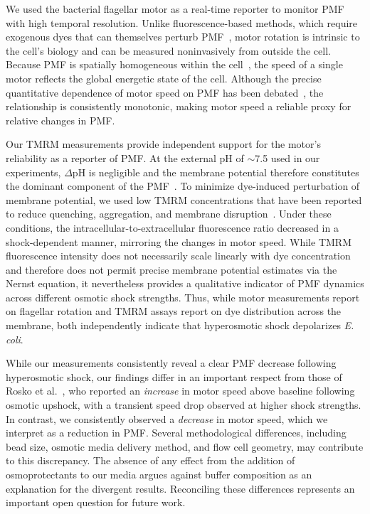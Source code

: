\documentclass[twocolumn]{biophys-new}%
\begin{document}
We used the bacterial flagellar motor as a real-time reporter to monitor PMF with high temporal resolution. Unlike fluorescence-based methods, which require exogenous dyes that can themselves perturb PMF~\cite{MANCINI20204l}, motor rotation is intrinsic to the cell's biology and can be measured noninvasively from outside the cell. Because PMF is spatially homogeneous within the cell~\cite{biquet2024spatiotemporal}, the speed of a single motor reflects the global energetic state of the cell. Although the precise quantitative dependence of motor speed on PMF has been debated~\cite{fung_berg1995,GABEL2003l,Krasnopeeva2024}, the relationship is consistently monotonic,  making motor speed a reliable proxy for relative changes in PMF.

Our TMRM measurements provide independent support for the motor’s reliability as a reporter of PMF. At the external pH of $\sim$7.5 used in our experiments, $\Delta \text{pH}$ is negligible and the membrane potential therefore constitutes the dominant component of the PMF~\cite{padan1976,slonczewski1981}. To minimize dye-induced perturbation of membrane potential, we used low TMRM concentrations that have been reported to reduce quenching, aggregation, and membrane disruption~\cite{LO2007etl,jinetal2023l}. Under these conditions, the intracellular-to-extracellular fluorescence ratio decreased in a shock-dependent manner, mirroring the changes in motor speed. While TMRM fluorescence intensity does not necessarily scale linearly with dye concentration and therefore does not permit precise membrane potential estimates via the Nernst equation, it nevertheless provides a qualitative indicator of PMF dynamics across different osmotic shock strengths. Thus, while motor measurements report on flagellar rotation and TMRM assays report on dye distribution across the membrane, both independently indicate that hyperosmotic shock depolarizes \textit{E. coli}.

While our measurements consistently reveal a clear PMF decrease following hyperosmotic shock, our findings differ in an important respect from those of Rosko et al.~\cite{rosko-2017}, who reported an \textit{increase} in motor speed above baseline following osmotic upshock, with a transient speed drop observed at higher shock strengths. In contrast, we consistently observed a \textit{decrease} in motor speed, which we interpret as a reduction in PMF. Several methodological differences, including bead size, osmotic media delivery method, and flow cell geometry, may contribute to this discrepancy.  The absence of any effect from the addition of osmoprotectants to our media argues against buffer composition as an explanation for the divergent results. Reconciling these differences represents an important open question for future work.
\end{document}
